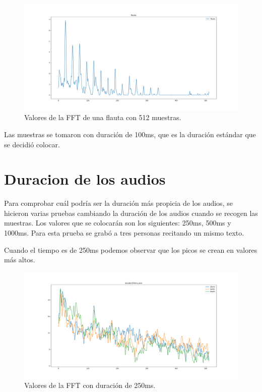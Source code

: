 \documentclass[a4paper, 12pt]{book}
\begin{document}
\begin{figure}
	\centering
	\includegraphics[width=12cm, keepaspectratio]{img/flauta512.png}
	\caption{Valores de la FFT de una flauta con 512 muestras.}\label{fig:flauta}
\end{figure}

Las muestras se tomaron con duración de 100ms, que es la duración estándar que se decidió colocar.

\section{Duracion de los audios}
\label{sec:duracion-audio}

Para comprobar cuál podría ser la duración más propicia de los audios, se hicieron varias pruebas cambiando la duración de los audios cuando se recogen las muestras. Los valores que se colocarán son los siguientes: 250ms, 500ms y 1000ms. Para esta prueba se grabó a tres personas recitando un mismo texto.

Cuando el tiempo es de 250ms podemos observar que los picos se crean en valores más altos.

\begin{figure}
	\centering
	\includegraphics[width=12cm, keepaspectratio]{img/locutor250ms.png}
	\caption{Valores de la FFT con duración de 250ms.}\label{fig:locutor250ms}
\end{figure}
\end{document}
